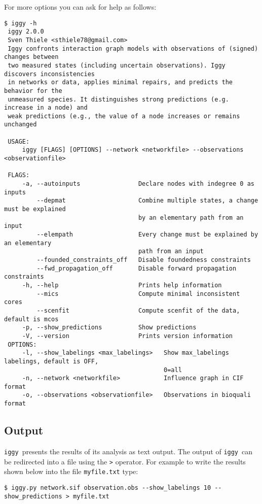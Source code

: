 \documentclass{article}
\newcommand\iggy{\texttt{iggy}}
\begin{document}
For more options you can ask for help as follows:
\begin{Verbatim}[frame=single]
 $ iggy -h
 iggy 2.0.0
 Sven Thiele <sthiele78@gmail.com>
 Iggy confronts interaction graph models with observations of (signed) changes between 
 two measured states (including uncertain observations). Iggy discovers inconsistencies
 in networks or data, applies minimal repairs, and predicts the behavior for the 
 unmeasured species. It distinguishes strong predictions (e.g. increase in a node) and
 weak predictions (e.g., the value of a node increases or remains unchanged

 USAGE:
     iggy [FLAGS] [OPTIONS] --network <networkfile> --observations <observationfile>

 FLAGS:
     -a, --autoinputs                Declare nodes with indegree 0 as inputs
         --depmat                    Combine multiple states, a change must be explained
                                     by an elementary path from an input
         --elempath                  Every change must be explained by an elementary 
                                     path from an input
         --founded_constraints_off   Disable foundedness constraints
         --fwd_propagation_off       Disable forward propagation constraints
     -h, --help                      Prints help information
         --mics                      Compute minimal inconsistent cores
         --scenfit                   Compute scenfit of the data, default is mcos
     -p, --show_predictions          Show predictions
     -V, --version                   Prints version information
 OPTIONS:
     -l, --show_labelings <max_labelings>   Show max_labelings labelings, default is OFF,
                                            0=all
     -n, --network <networkfile>            Influence graph in CIF format
     -o, --observations <observationfile>   Observations in bioquali format
\end{Verbatim}

\subsection{Output}

\iggy\ presents the results of its analysis as text output. 
The output of \iggy\ can be redirected into a file using the \texttt{>} operator.
For example to write the results shown below into the file \texttt{myfile.txt} type:

\begin{Verbatim}[frame=single]
$ iggy.py network.sif observation.obs --show_labelings 10 --show_predictions > myfile.txt
\end{Verbatim}
\end{document}
